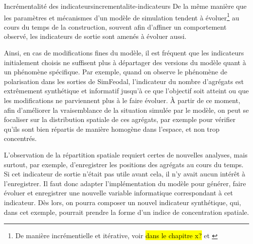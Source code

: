 \begin{encadre}{Incrémentalité des indicateurs}{incrementalite-indicateurs}
\renewcommand{\thempfootnote}{\alph{mpfootnote}}
De la même manière que les paramètres et mécanismes d'un modèle de simulation tendent à évoluer\footnote{
	De manière incrémentielle et itérative, voir \hl{dans le chapitre x?} et \cite[\url{http://itsadeliverything.com/revisiting-the-iterative-incremental-mona-lisa}]{thomas_revisiting_2012}
} au cours du temps de la construction, souvent afin d'affiner un comportement observé, les indicateurs de sortie sont amenés à évoluer aussi.

Ainsi, en cas de modifications fines du modèle, il est fréquent que les indicateurs initialement choisis ne suffisent plus à départager des versions du modèle quant à un phénomène spécifique.
Par exemple, quand on observe le phénomène de polarisation dans les sorties de SimFeodal, l'indicateur du nombre d'agrégats est extrêmement synthétique et informatif jusqu'à ce que l'objectif soit atteint ou que les modifications ne parviennent plus à le faire évoluer.
À partir de ce moment, afin d'améliorer la vraisemblance de la situation simulée par le modèle, on peut se focaliser sur la distribution spatiale de ces agrégats, par exemple pour vérifier qu'ils sont bien répartis de manière homogène dans l'espace, et non trop concentrés.

L'observation de la répartition spatiale requiert certes de nouvelles analyses, mais surtout, par exemple, d'enregistrer les positions des agrégats au cours du temps.
Si cet indicateur de sortie n'était pas utile avant cela, il n'y avait aucun intérêt à l'enregistrer.
Il faut donc adapter l'implémentation du modèle pour générer, faire évoluer et enregistrer une nouvelle variable informatique correspondant à cet indicateur.
Dès lors, on pourra composer un nouvel indicateur synthétique, qui, dans cet exemple, pourrait prendre la forme d'un indice de concentration spatiale.


\end{encadre}
